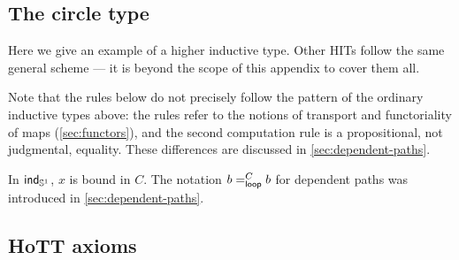 \subsection{The circle type}

Here we give an example of a higher inductive type.  Other HITs follow the same
general scheme --- it is beyond the scope of this appendix to cover them all.

Note that the rules below do not precisely follow the pattern of the ordinary
inductive types above: the rules refer to the notions of transport and
functoriality of maps (\autoref{sec:functors}), and the second computation rule
is a propositional, not judgmental, equality. These differences are discussed
in \autoref{sec:dependent-paths}.


In $\ind{\Sn^1}$, $x$ is bound in $C$.  The notation ${\dpath C \lloop b b}$ for dependent paths was introduced in \autoref{sec:dependent-paths}.

\subsection{HoTT axioms}

